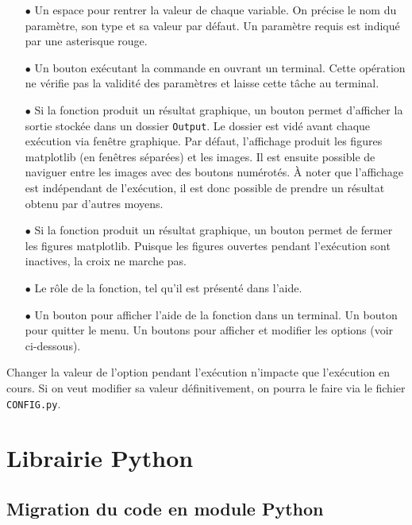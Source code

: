\documentclass[12pt]{article}
\begin{document}
    \begin{enumerate}
        \item[$\bullet$] Un espace pour rentrer la valeur de chaque variable. On précise le nom du paramètre, son type et sa valeur par défaut. Un paramètre requis est indiqué par une asterisque rouge.

        \item[$\bullet$] Un bouton exécutant la commande en ouvrant un terminal. Cette opération ne vérifie pas la validité des paramètres et laisse cette tâche au terminal.

        \item[$\bullet$] Si la fonction produit un résultat graphique, un bouton permet d'afficher la sortie stockée dans un dossier \texttt{Output}. Le dossier est vidé avant chaque exécution via fenêtre graphique. Par défaut, l'affichage produit les figures matplotlib (en fenêtres séparées) et les images. Il est ensuite possible de naviguer entre les images avec des boutons numérotés. À noter que l'affichage est indépendant de l'exécution, il est donc possible de prendre un résultat obtenu par d'autres moyens.

        \item[$\bullet$] Si la fonction produit un résultat graphique, un bouton permet de fermer les figures matplotlib. Puisque les figures ouvertes pendant l'exécution sont inactives, la croix ne marche pas.

        \item[$\bullet$] Le rôle de la fonction, tel qu'il est présenté dans l'aide.

        \item[$\bullet$] Un bouton pour afficher l'aide de la fonction dans un terminal. Un bouton pour quitter le menu. Un boutons pour afficher et modifier les options (voir ci-dessous).
    \end{enumerate}

    Changer la valeur de l'option pendant l'exécution n'impacte que l'exécution en cours. Si on veut modifier sa valeur définitivement, on pourra le faire via le fichier \texttt{CONFIG.py}.

\newpage
\section{Librairie Python}
\subsection{Migration du code en module Python}
\end{document}
